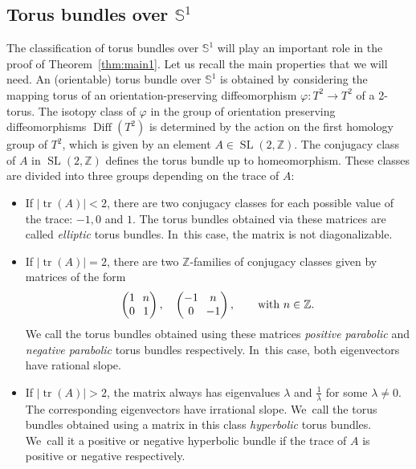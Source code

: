 \documentclass[10pt]{amsart}
\DeclareMathOperator{\SL}{SL}
\theoremstyle{definition}
\begin{document}
\subsection{Torus bundles over $\mathbb{S}^1$}
The classification of torus bundles over $\mathbb{S}^1$ will play an important role in the proof of Theorem~\ref{thm:main1}. Let us recall the main properties that we will need. An (orientable) torus bundle over $\mathbb{S}^1$ is obtained by considering the mapping torus of an orientation-preserving diffeomorphism $\varphi:T^2\to T^2$ of a 2-torus. The isotopy class of $\varphi$ in the group of orientation preserving diffeomorphisms $\operatorname{Diff}(T^2)$ is determined by the action on the first homology group of $T^2$, which is given by an element $A\in \SL(2,\mathbb{Z})$.
The conjugacy class of $A$ in $\SL(2,\mathbb{Z})$ defines the torus bundle up to homeomorphism. These classes are divided into three groups depending on the trace of $A$:
\begin{itemize}
\item
If $|{\operatorname{tr}(A)}|<2$, there are two conjugacy classes for each possible value of the trace: $-1, 0$ and $1$. The torus bundles obtained via these matrices are called \textit{elliptic} torus bundles. In~this case, the matrix is not diagonalizable.
\item
If $|{\operatorname{tr}(A)}|=2$, there are two $\mathbb{Z}$-families of conjugacy classes given by matrices of the form
\[
\arraycolsep3.5pt
\begin{pmatrix}
1 & n \\
0 & 1
\end{pmatrix},\quad \begin{pmatrix}
-1 & n \\
0 & -1
\end{pmatrix}, \qquad\text{with } n\in \mathbb{Z}.
\]
We call the torus bundles obtained using these matrices \textit{positive parabolic} and \textit{negative parabolic} torus bundles respectively. In~this case, both eigenvectors have rational slope.
\item
If $|{\operatorname{tr}(A)}|>2$, the matrix always has eigenvalues $\lambda$ and $\frac{1}{\lambda}$ for some $\lambda\neq 0$. The corresponding eigenvectors have irrational slope. We~call the torus bundles obtained using a matrix in this class \textit{hyperbolic} torus bundles. We~call it a positive or negative hyperbolic bundle if the trace of $A$ is positive or negative respectively.
\end{itemize}
\end{document}
